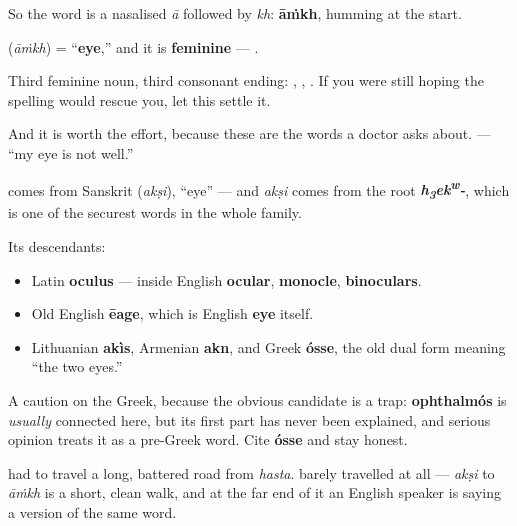 So the word is a nasalised \emph{ā} followed by \emph{kh}: \textbf{āṁkh}, humming at the start.

\begin{grammarlens}[title={Grammar Lens: feminine, and one you will use daily}]
\textbf{} (\emph{āṁkh}) = \textquotedblleft{}\textbf{eye},\textquotedblright{} and it is \textbf{feminine} — \textbf{ }.

Third feminine noun, third consonant ending: \textbf{}, \textbf{}, \textbf{}. If you were still hoping the spelling would rescue you, let this settle it.

And it is worth the effort, because these are the words a doctor asks about. \textbf{    } — \textquotedblleft{}my eye is not well.\textquotedblright{}
\end{grammarlens}

\begin{cousinweb}
\textbf{} comes from Sanskrit \textbf{} (\emph{akṣi}), \textquotedblleft{}eye\textquotedblright{} — and \emph{akṣi} comes from the root \emph{\textbf{h\textsubscript{3}ek\textsuperscript{w}-}}, which is one of the securest words in the whole family.

Its descendants:

\begin{itemize}
\raggedright
  \item Latin \textbf{oculus} — inside English \textbf{ocular}, \textbf{monocle}, \textbf{binoculars}.
  \item Old English \textbf{ēage}, which is English \textbf{eye} itself.
  \item Lithuanian \textbf{akìs}, Armenian \textbf{akn}, and Greek \textbf{ósse}, the old dual form meaning \textquotedblleft{}the two eyes.\textquotedblright{}
\end{itemize}

A caution on the Greek, because the obvious candidate is a trap: \textbf{ophthalmós} is \emph{usually} connected here, but its first part has never been explained, and serious opinion treats it as a pre-Greek word. Cite \textbf{ósse} and stay honest.

\textbf{} had to travel a long, battered road from \emph{hasta}. \textbf{} barely travelled at all — \emph{akṣi} to \emph{āṁkh} is a short, clean walk, and at the far end of it an English speaker is saying a version of the same word.
\end{cousinweb}

